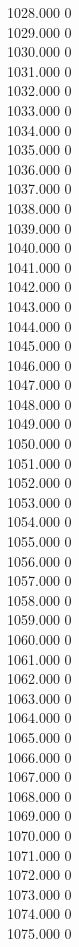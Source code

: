 { 1028.000	0 \\
 1029.000	0 \\
 1030.000	0 \\
 1031.000	0 \\
 1032.000	0 \\
 1033.000	0 \\
 1034.000	0 \\
 1035.000	0 \\
 1036.000	0 \\
 1037.000	0 \\
 1038.000	0 \\
 1039.000	0 \\
 1040.000	0 \\
 1041.000	0 \\
 1042.000	0 \\
 1043.000	0 \\
 1044.000	0 \\
 1045.000	0 \\
 1046.000	0 \\
 1047.000	0 \\
 1048.000	0 \\
 1049.000	0 \\
 1050.000	0 \\
 1051.000	0 \\
 1052.000	0 \\
 1053.000	0 \\
 1054.000	0 \\
 1055.000	0 \\
 1056.000	0 \\
 1057.000	0 \\
 1058.000	0 \\
 1059.000	0 \\
 1060.000	0 \\
 1061.000	0 \\
 1062.000	0 \\
 1063.000	0 \\
 1064.000	0 \\
 1065.000	0 \\
 1066.000	0 \\
 1067.000	0 \\
 1068.000	0 \\
 1069.000	0 \\
 1070.000	0 \\
 1071.000	0 \\
 1072.000	0 \\
 1073.000	0 \\
 1074.000	0 \\
 1075.000	0 \\
}
